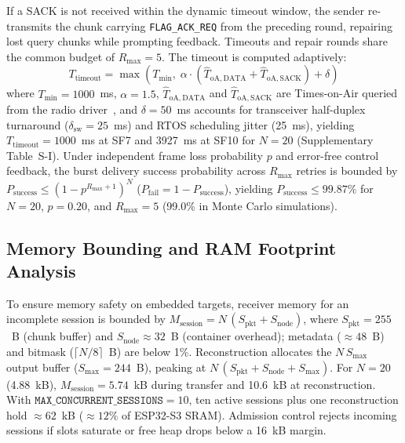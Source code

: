 \documentclass[journal]{IEEEtran}
\begin{document}
If a \ac{SACK} is not received within the dynamic timeout window, the sender re-transmits the chunk carrying \texttt{FLAG\_ACK\_REQ} from the preceding round, repairing lost query chunks while prompting feedback. Timeouts and repair rounds share the common budget of $R_{\mathrm{max}} = 5$. The timeout is computed adaptively:
\begin{equation}
T_{\mathrm{timeout}} = \max\!\left(T_{\min},\;\alpha\cdot\left(\widehat{T}_{\mathrm{oA, DATA}} + \widehat{T}_{\mathrm{oA, SACK}}\right) + \delta\right)
\label{eq:timeout}
\end{equation}
where $T_{\min} = 1000$~ms, $\alpha = 1.5$, $\widehat{T}_{\mathrm{oA, DATA}}$ and $\widehat{T}_{\mathrm{oA, SACK}}$ are Times-on-Air queried from the radio driver~\cite{semtech-an1200}, and $\delta = 50$~ms accounts for transceiver half-duplex turnaround ($\delta_{\mathrm{sw}} = 25$~ms) and RTOS scheduling jitter (25~ms), yielding $T_{\mathrm{timeout}} = 1000$~ms at SF7 and 3927~ms at SF10 for $N=20$ (Supplementary Table~S-I). Under independent frame loss probability $p$ and error-free control feedback, the burst delivery success probability across $R_{\mathrm{max}}$ retries is bounded by $P_{\mathrm{success}} \le \left(1 - p^{R_{\mathrm{max}} + 1}\right)^N$ ($P_{\mathrm{fail}} = 1 - P_{\mathrm{success}}$), yielding $P_{\mathrm{success}} \le 99.87\%$ for $N=20$, $p=0.20$, and $R_{\mathrm{max}}=5$ (99.0\% in Monte Carlo simulations).

\subsection{Memory Bounding and RAM Footprint Analysis}
To ensure memory safety on embedded targets, receiver memory for an incomplete session is bounded by $M_{\mathrm{session}} = N\,(S_{\mathrm{pkt}} + S_{\mathrm{node}})$, where $S_{\mathrm{pkt}} = 255$~B (chunk buffer) and $S_{\mathrm{node}} \approx 32$~B (container overhead); metadata ($\approx 48$~B) and bitmask ($\lceil N/8 \rceil$~B) are below 1\%. Reconstruction allocates the $N\,S_{\max}$ output buffer ($S_{\max} = 244$~B), peaking at $N\,(S_{\mathrm{pkt}} + S_{\mathrm{node}} + S_{\max})$. For $N=20$ (4.88~kB), $M_{\mathrm{session}} = 5.74$~kB during transfer and 10.6~kB at reconstruction. With $\texttt{MAX\_CONCURRENT\_SESSIONS} = 10$, ten active sessions plus one reconstruction hold $\approx 62$~kB ($\approx 12\%$ of ESP32-S3 SRAM). Admission control rejects incoming sessions if slots saturate or free heap drops below a 16~kB margin.
\end{document}
